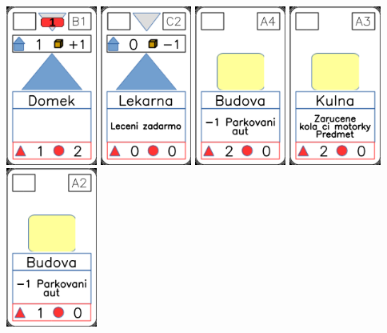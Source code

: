 \documentclass[a4paper]{article}
\begin{document}
	\includegraphics[width=3.0cm]{img-3_5}
	\includegraphics[width=3.0cm]{img-3_11}
	\includegraphics[width=3.0cm]{img-2_3}
	\includegraphics[width=3.0cm]{img-2_17}
	\includegraphics[width=3.0cm]{img-2_1}
\end{document}
